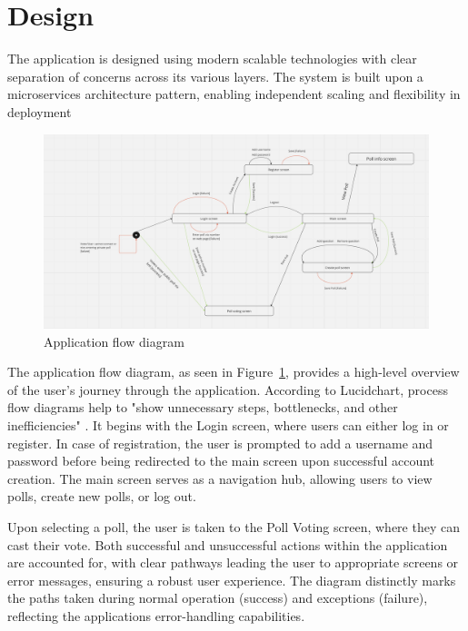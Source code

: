 \section{Design}
\label{sec:design}

The application is designed using modern scalable technologies with clear separation of concerns across its various layers. 
The system is built upon a microservices \cite{Dragoni2017} architecture pattern, enabling independent scaling and flexibility in deployment


\begin{figure}[!htbp]
\centering
\includegraphics[width=\linewidth]{figs/ApplicationFlowDiagram.png}
\caption{Application flow diagram}
\label{fig:appflow}
\end{figure}

The application flow diagram, as seen in Figure~\ref{fig:appflow}, provides a high-level overview of the user's journey through the application. According to Lucidchart, process flow diagrams help to "show unnecessary steps, bottlenecks, and other inefficiencies" \cite{lucidchart2023}. It begins with the Login screen, where users can either log in or register. In case of registration, the user is prompted to add a username and password before being redirected to the main screen upon successful account creation. The main screen serves as a navigation hub, allowing users to view polls, create new polls, or log out.

Upon selecting a poll, the user is taken to the Poll Voting screen, where they can cast their vote. Both successful and unsuccessful actions within the application are accounted for, with clear pathways leading the user to appropriate screens or error messages, ensuring a robust user experience. The diagram distinctly marks the paths taken during normal operation (success) and exceptions (failure), reflecting the applications error-handling capabilities.

